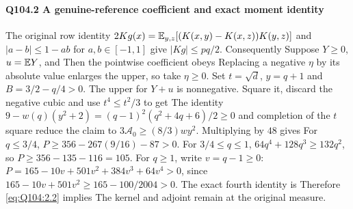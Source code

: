 \paragraph{Q104.2 A genuine-reference coefficient and exact moment identity}\label{part:Q104.2}
The original row identity
$2Kg(x)=\allowbreak \mathbb E_{y,\allowbreak z}[(K(x,\allowbreak y)-K(x,\allowbreak z))K(y,\allowbreak z)]$ and
$|a-b|\le\allowbreak 1-ab$ for $a,\allowbreak b\in[-1,\allowbreak 1]$ give $|Kg|\le\allowbreak  pq/2$.
Consequently
Suppose $Y\ge\allowbreak 0$, $u=\allowbreak \mathbb E Y$, and
Then the pointwise coefficient obeys
Replacing a negative $\eta$ by its absolute value enlarges the upper,
so take $\eta\ge\allowbreak 0$. Set $t=\allowbreak \sqrt d$, $y=\allowbreak q+1$ and $B=\allowbreak 3/2-q/4>\allowbreak 0$.
The upper for $Y+u$ is nonnegative. Square it, discard the negative
cubic and use $t^4\le\allowbreak  t^2/3$ to get
The identity $9-w(q)(y^2+2)=\allowbreak (q-1)^2(q^2+4q+6)/2\ge\allowbreak 0$ and
completion of the $t$ square reduce the claim to
$3\mathcal A_0\ge\allowbreak (8/3)wy^2$. Multiplying by $48$ gives
For $q\le\allowbreak 3/4$, $P\ge\allowbreak 356-267(9/16)-87>\allowbreak 0$.
For $3/4\le\allowbreak  q\le\allowbreak 1$, $64q^4+128q^3\ge\allowbreak 132q^2$, so
$P\ge\allowbreak 356-135-116=\allowbreak 105$.
For $q\ge\allowbreak 1$, write $v=\allowbreak q-1\ge\allowbreak 0$:
$P=\allowbreak 165-10v+501v^2+384v^3+64v^4>\allowbreak 0$, since
$165-10v+501v^2\ge\allowbreak 165-100/2004>\allowbreak 0$.
The exact fourth identity is
Therefore \eqref{eq:Q104:2.2} implies
The kernel and adjoint remain at the original measure.

